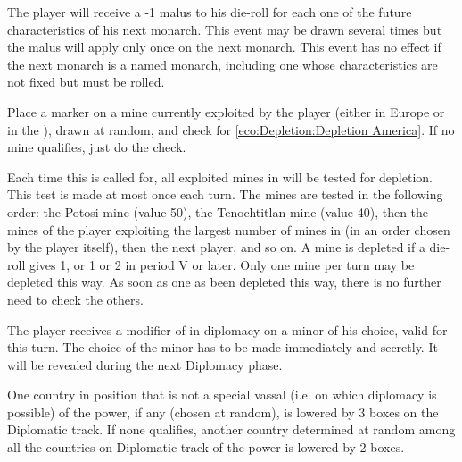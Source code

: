 
The player will receive a -1 malus to his die-roll for each one of the future
characteristics of his next monarch. This event may be drawn several times but
the malus will apply only once on the next monarch. This event has no effect
if the next monarch is a named monarch, including one whose characteristics
are not fixed but must be rolled.




Place a marker  on a mine currently exploited by
the player (either in Europe or in the \ROTW), drawn at random, and check for
\ref{eco:Depletion:Depletion America}. If no mine qualifies, just do the
check.



\phevnt
\aparag Each time this is called for, all exploited mines in \continentAmerica
will be tested for depletion. This test is made at most once each turn.
\bparag The mines are tested in the following order: the Potosi mine (value
50), the Tenochtitlan mine (value 40), then the mines of the player exploiting
the largest number of mines in \continentAmerica (in an order chosen by the
player itself), then the next player, and so on.
\bparag A mine is depleted if a die-roll gives 1, or 1 or 2 in period V or
later.
\aparag Only one mine per turn may be depleted this way. As soon as one as
been depleted this way, there is no further need to check the others.




The player receives a modifier of  in diplomacy on a minor of his
choice, valid for this turn. The choice of the minor has to be made
immediately and secretly. It will be revealed during the next Diplomacy phase.




One country in \VASSAL position that is not a special vassal (i.e. on which
diplomacy is possible) of the power, if any (chosen at random), is lowered by
3 boxes on the Diplomatic track.  If none qualifies, another country
determined at random among all the countries on Diplomatic track of the power
is lowered by 2 boxes.



